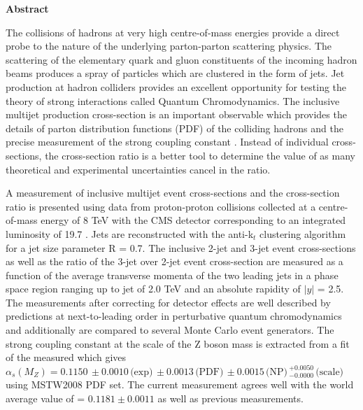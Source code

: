 \begin{center}
{\bf \huge Abstract}
\end{center}

The collisions of hadrons at very high centre-of-mass energies provide a direct probe to the nature of the underlying parton-parton scattering physics. The scattering of the elementary quark and gluon constituents of the incoming hadron beams produces a spray of particles which are clustered in the form of jets. Jet production at hadron colliders provides an excellent opportunity for testing the theory of strong interactions called Quantum Chromodynamics. The inclusive multijet production cross-section is an important observable which provides the details of parton distribution functions (PDF) of the colliding hadrons and the precise measurement of the strong coupling constant \alps. Instead of individual cross-sections, the cross-section ratio is a better tool to determine the value of \alps as many theoretical and experimental uncertainties cancel in the ratio.

A measurement of inclusive multijet event cross-sections and the cross-section ratio is presented using data from proton-proton collisions collected at a centre-of-mass energy of 8 TeV with the CMS detector corresponding to an integrated luminosity of 19.7 \fbinv. Jets are reconstructed with the anti-k$_t$ clustering algorithm for a jet size parameter R = 0.7. The inclusive 2-jet and 3-jet event cross-sections as well as the ratio of the 3-jet over 2-jet event cross-section \ratio are measured as a function of the average transverse momenta \pt of the two leading jets in a phase space region ranging up to jet \pt of 2.0 TeV and an absolute rapidity of $|y|$ = 2.5. The measurements after correcting for detector effects are well described by predictions at next-to-leading order in perturbative quantum chromodynamics and additionally are compared to several Monte Carlo event generators. The strong coupling constant at the scale of the Z boson mass is extracted from a fit of the measured \ratio which gives $\alpha_s(M_Z) = 0.1150\,\pm0.0010\,\textrm{(exp)}\,\pm0.0013\,\textrm{(PDF)}\, \pm0.0015\,\textrm{(NP)}\,^{+0.0050}_{-0.0000}\,\textrm{(scale)}$ using MSTW2008 PDF set. The current measurement agrees well with the world average value of \alpsmz = $0.1181 \pm 0.0011$ as well as previous measurements.
